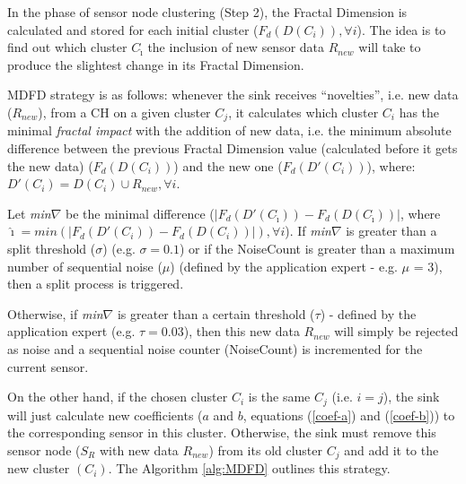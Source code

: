 \documentclass{acm_proc_article-sp}
\begin{document}
In the phase of sensor node clustering (Step 2), the Fractal Dimension is 
calculated and stored for each initial cluster
($F_{d}(D(C_i)), \forall i$). The idea is to find out which cluster
$C_{\hat{\imath}}$ the inclusion of new sensor data $R_{new}$ will take to produce
the slightest change in its Fractal Dimension.
\vspace*{-.3cm}

MDFD strategy is as follows:
whenever the sink receives ``novelties'', i.e. new data ($R_{new}$), from a CH on
a given cluster $C_j$, it calculates which cluster $C_i$ has the minimal
\textit{fractal impact} with the addition of new data, i.e. the minimum absolute
difference between the previous Fractal Dimension value (calculated before it
gets the new data) ($F_d(D(C_i))$) and the new one ($F_d(D'(C_i))$), where:
$D'(C_i) = D(C_i) \cup R_{new}, \forall i$.
\vspace*{-.3cm}

Let {\it min}$\nabla$ be the minimal difference ($|F_d(D'(C_{\hat{\imath}})) -
F_d(D(C_{\hat{\imath}}))|$, where $\hat{\imath} = min(|F_d(D'(C_i)) - F_d(D(C_i))|),
\forall i$). If {\it min}$\nabla$ is greater than a split threshold ($\sigma$)
(e.g. $\sigma = 0.1$) or if the NoiseCount is greater than a maximum number of
sequential noise ($\mu$) (defined by the application expert - e.g. $\mu$ = 3),
then a split process is triggered.
\vspace*{-.3cm}

Otherwise, if {\it min}$\nabla$ is greater than a certain threshold ($\tau$) -
defined by the application expert (e.g. $\tau = 0.03$), then this new data
$R_{new}$ will simply be rejected as noise and a sequential noise counter
(NoiseCount) is incremented for the current sensor.
\vspace*{-.3cm}

On the other hand, if the chosen cluster $C_i$ is the same $C_j$ (i.e.
$i=j$), the sink will just calculate new coefficients ($a$ and $b$, equations
(\ref{coef-a}) and (\ref{coef-b})) to the corresponding sensor in this cluster.
Otherwise, the sink must remove this sensor node ($S_{R}$ with new data
$R_{new}$) from its old cluster $C_j$ and add it to the new cluster $(C_i)$.
The Algorithm \ref{alg:MDFD} outlines this strategy.
\end{document}
